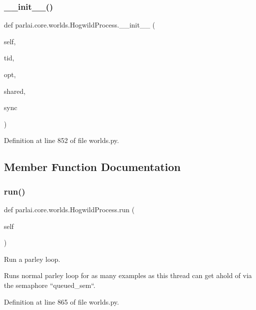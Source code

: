 \subsubsection{\texorpdfstring{\+\_\+\+\_\+init\+\_\+\+\_\+()}{\_\_init\_\_()}}
{\footnotesize\ttfamily def parlai.\+core.\+worlds.\+Hogwild\+Process.\+\_\+\+\_\+init\+\_\+\+\_\+ (\begin{DoxyParamCaption}\item[{}]{self,  }\item[{}]{tid,  }\item[{}]{opt,  }\item[{}]{shared,  }\item[{}]{sync }\end{DoxyParamCaption})}



Definition at line 852 of file worlds.\+py.



\subsection{Member Function Documentation}
\mbox{\label{classparlai_1_1core_1_1worlds_1_1HogwildProcess_a749caf3085cb7b373db66b6f92567290}} 
\subsubsection{\texorpdfstring{run()}{run()}}
{\footnotesize\ttfamily def parlai.\+core.\+worlds.\+Hogwild\+Process.\+run (\begin{DoxyParamCaption}\item[{}]{self }\end{DoxyParamCaption})}

\begin{DoxyVerb}Run a parley loop.

Runs normal parley loop for as many examples as this thread can get
ahold of via the semaphore ``queued_sem``.
\end{DoxyVerb}
 

Definition at line 865 of file worlds.\+py.




